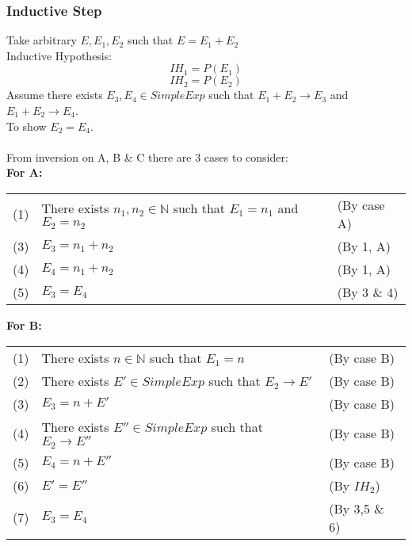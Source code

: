 \documentclass{report}
\begin{document}
\subsubsection*{Inductive Step}
Take arbitrary $E, E_1,E_2$ such that $E = E_1 + E_2$
\\ Inductive Hypothesis:
\[IH_1 = P(E_1)\]
\[IH_2 = P(E_2)\]
Assume there exists $E_3, E_4 \in SimpleExp$ such that $E_1 + E_2 \to E_3$ and $E_1 + E_2 \to E_4$.
\\ To show $E_2 = E_4$.
\\
\\ From inversion on A, B \& C there are 3 cases to consider:
\\ \textbf{For A:}
\begin{center}
	\begin{tabular}{l l l}
		(1) & There exists $n_1, n_2 \in \mathbb{N}$ such that $E_1 = n_1$ and $E_2 = n_2$ & (By case A) \\
		(3) & $E_3 = n_1 + n_2$                                                            & (By 1, A)   \\
		(4) & $E_4 = n_1 + n_2$                                                            & (By 1, A)   \\
		(5) & $E_3 = E_4$                                                                  & (By 3 \& 4) \\
	\end{tabular}
\end{center}
\textbf{For B:}
\begin{center}
	\begin{tabular}{l l l}
		(1) & There exists $n \in \mathbb{N}$ such that $E_1 = n$      & (By case B)   \\
		(2) & There exists $E' \in SimpleExp$ such that $E_2 \to E'$   & (By case B)   \\
		(3) & $E_3 = n + E'$                                           & (By case B)   \\
		(4) & There exists $E'' \in SimpleExp$ such that $E_2 \to E''$ & (By case B)   \\
		(5) & $E_4 = n + E''$                                          & (By case B)   \\
		(6) & $E' = E''$                                               & (By $IH_2$)   \\
		(7) & $E_3 = E_4$                                              & (By 3,5 \& 6) \\
	\end{tabular}
\end{center}
\end{document}
